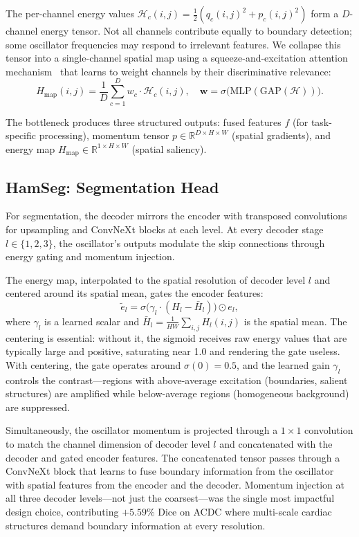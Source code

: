 \documentclass[11pt]{article}
\begin{document}
The per-channel energy values $\mathcal{H}_c(i,j) = \tfrac{1}{2}(q_c(i,j)^2 + p_c(i,j)^2)$ form a $D$-channel energy tensor. Not all channels contribute equally to boundary detection; some oscillator frequencies may respond to irrelevant features. We collapse this tensor into a single-channel spatial map using a squeeze-and-excitation attention mechanism~\cite{hu2018senet} that learns to weight channels by their discriminative relevance:
\begin{equation}
    H_\text{map}(i,j) = \frac{1}{D}\sum_{c=1}^{D} w_c \cdot \mathcal{H}_c(i,j), \quad \bm{w} = \sigma\!\big(\text{MLP}(\text{GAP}(\mathcal{H}))\big).
    \label{eq:energy_map}
\end{equation}

The bottleneck produces three structured outputs: fused features $f$ (for task-specific processing), momentum tensor $p \in \mathbb{R}^{D \times H \times W}$ (spatial gradients), and energy map $H_\text{map} \in \mathbb{R}^{1 \times H \times W}$ (spatial saliency).


\subsection{HamSeg: Segmentation Head}

For segmentation, the decoder mirrors the encoder with transposed convolutions for upsampling and ConvNeXt blocks at each level. At every decoder stage $l \in \{1, 2, 3\}$, the oscillator's outputs modulate the skip connections through energy gating and momentum injection.

The energy map, interpolated to the spatial resolution of decoder level $l$ and centered around its spatial mean, gates the encoder features:
\begin{equation}
    \tilde{e}_l = \sigma\!\big(\gamma_l \cdot (H_l - \bar{H}_l)\big) \odot e_l,
    \label{eq:gate}
\end{equation}
where $\gamma_l$ is a learned scalar and $\bar{H}_l = \frac{1}{HW}\sum_{i,j}H_l(i,j)$ is the spatial mean. The centering is essential: without it, the sigmoid receives raw energy values that are typically large and positive, saturating near 1.0 and rendering the gate useless. With centering, the gate operates around $\sigma(0) = 0.5$, and the learned gain $\gamma_l$ controls the contrast---regions with above-average excitation (boundaries, salient structures) are amplified while below-average regions (homogeneous background) are suppressed.

Simultaneously, the oscillator momentum is projected through a $1 \times 1$ convolution to match the channel dimension of decoder level $l$ and concatenated with the decoder and gated encoder features. The concatenated tensor passes through a ConvNeXt block that learns to fuse boundary information from the oscillator with spatial features from the encoder and the decoder. Momentum injection at all three decoder levels---not just the coarsest---was the single most impactful design choice, contributing $+5.59\%$ Dice on ACDC where multi-scale cardiac structures demand boundary information at every resolution.
\end{document}
